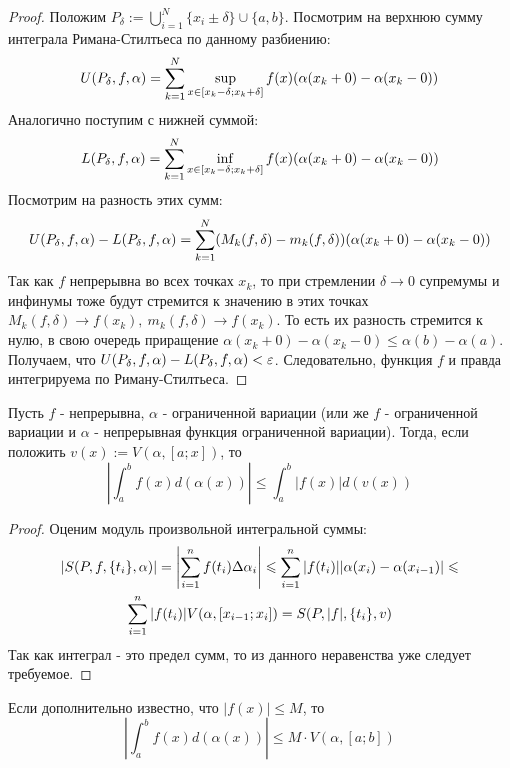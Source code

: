 \begin{proof}
	Положим $P_\delta := \bigcup\limits_{i = 1}^N \{x_i \pm \delta\} \cup \{a, b\}$. Посмотрим на верхнюю сумму интеграла Римана-Стилтьеса по данному разбиению:
	\[
		U(P_\delta, f, \alpha) = \sum\limits_{k = 1}^N \sup\limits_{x \in [x_k - \delta; x_k + \delta]} f(x) (\alpha(x_k + 0) - \alpha(x_k - 0))
	\]
	Аналогично поступим с нижней суммой:
	\[
		L(P_\delta, f, \alpha) = \sum\limits_{k = 1}^N \inf\limits_{x \in [x_k - \delta; x_k + \delta]} f(x) (\alpha(x_k + 0) - \alpha(x_k - 0))
	\]
	Посмотрим на разность этих сумм:
	\[
		U(P_\delta, f, \alpha) - L(P_\delta, f, \alpha) = \sum\limits_{k = 1}^N (M_k(f, \delta) - m_k(f, \delta)) (\alpha(x_k + 0) - \alpha(x_k - 0))
	\]
	Так как $f$ непрерывна во всех точках $x_k$, то при стремлении $\delta \to 0$ супремумы и инфинумы тоже будут стремится к значению в этих точках $M_k(f, \delta) \to f(x_k),\ m_k(f, \delta) \to f(x_k)$. То есть их разность стремится к нулю, в свою очередь приращение $\alpha(x_k + 0) - \alpha(x_k - 0) \leq \alpha(b) - \alpha(a)$.
	Получаем, что $U(P_\delta, f, \alpha) - L(P_\delta, f, \alpha) < \varepsilon$. Следовательно, функция $f$ и правда интегрируема по Риману-Стилтьеса.
\end{proof}

\begin{theorem}
	Пусть $f$ - непрерывна, $\alpha$ - ограниченной вариации (или же $f$ - ограниченной вариации и $\alpha$ - непрерывная функция ограниченной вариации). Тогда, если положить $v(x) := V(\alpha, [a; x])$, то
	\[
		\left|\int_a^b f(x) d(\alpha(x))\right| \le \int_a^b |f(x)| d(v(x))
	\]
\end{theorem}

\begin{proof}
	Оценим модуль произвольной интегральной суммы:
	\begin{multline*}
		|S(P, f, \{t_i\}, \alpha)| = \left|\sum\limits_{i = 1}^n f(t_i) \Delta \alpha_i\right| \leqslant \sum\limits_{i = 1}^n |f(t_i)| |\alpha(x_i) - \alpha(x_{i - 1})| \leqslant
		\\
		\sum\limits_{i = 1}^n |f(t_i)| V(\alpha, [x_{i - 1}; x_i]) = S(P, |f|, \{t_i\}, v)
	\end{multline*}
	Так как интеграл - это предел сумм, то из данного неравенства уже следует требуемое.
\end{proof}

\begin{corollary}
	Если дополнительно известно, что $|f(x)| \le M$, то
	\[
		\left|\int_a^b f(x) d(\alpha(x))\right| \le M \cdot V(\alpha, [a; b])
	\]
\end{corollary}

